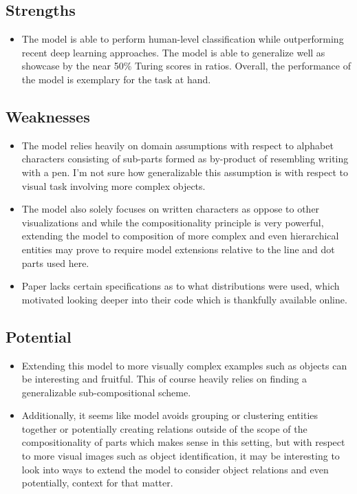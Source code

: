 \documentclass{article}
\begin{document}
\subsection{Strengths}
\begin{itemize}
    \item The model is able to perform human-level classification while outperforming recent deep learning approaches. The model is able to generalize well as showcase by the near 50\% Turing scores in ratios. Overall, the performance of the model is exemplary for the task at hand.
\end{itemize}

\subsection{Weaknesses}
\begin{itemize}
    \item The model relies heavily on domain assumptions with respect to alphabet characters consisting of sub-parts formed as by-product of resembling writing with a pen. I'm not sure how generalizable this assumption is with respect to visual task involving more complex objects.
    \item The model also solely focuses on written characters as oppose to other visualizations and while the compositionality principle is very powerful, extending the model to composition of more complex and even hierarchical entities may prove to require model extensions relative to the line and dot parts used here.
    \item Paper lacks certain specifications as to what distributions were used, which motivated looking deeper into their code which is thankfully available online.
\end{itemize}

\subsection{Potential}
\begin{itemize}
    \item Extending this model to more visually complex examples such as objects can be interesting and fruitful. This of course heavily relies on finding a generalizable sub-compositional scheme.
    \item Additionally, it seems like model avoids grouping or clustering entities together or potentially creating relations outside of the scope of the compositionality of parts which makes sense in this setting, but with respect to more visual images such as object identification, it may be interesting to look into ways to extend the model to consider object relations and even potentially, context for that matter.
\end{itemize}
\end{document}
